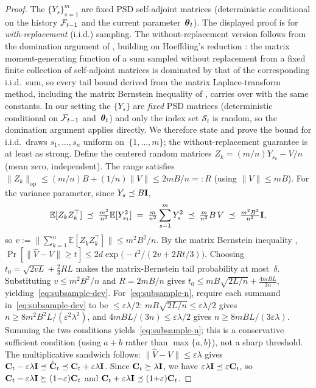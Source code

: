 \documentclass[twoside]{article}
\begin{document}
\begin{proof}
The $\{Y_s\}_{s=1}^m$ are fixed PSD self-adjoint matrices (deterministic
conditional on the history $\mathcal{F}_{t-1}$ and the current
parameter~$\boldsymbol{\theta}_t$).
The displayed proof is for \emph{with-replacement} (i.i.d.) sampling.
The without-replacement version follows from the domination argument of
\citet{gross2010note}, building on Hoeffding's reduction
\citep{hoeffding1963probability}: the matrix moment-generating function
of a sum sampled without replacement from a fixed finite collection of
self-adjoint matrices is dominated by that of the corresponding
i.i.d.\ sum, so every tail bound derived from the matrix
Laplace-transform method, including the matrix Bernstein inequality of
\citet[Thm.~6.1.1]{tropp2015introduction}, carries over with the same
constants.
In our setting the $\{Y_s\}$ are \emph{fixed} PSD matrices
(deterministic conditional on $\mathcal{F}_{t-1}$ and~$\boldsymbol{\theta}_t$) and only
the index set $\mathcal{S}_t$ is random, so the domination argument
applies directly.
We therefore state and prove the bound for i.i.d.\ draws
$s_1,\dots,s_n$ uniform on~$\{1,\dots,m\}$; the
without-replacement guarantee is at least as strong.
Define the centered random matrices
$Z_k = (m/n)Y_{s_k} - V/n$ (mean zero, independent).
The range satisfies
$\|Z_k\|_{\mathrm{op}} \le (m/n)B + (1/n)\|V\| \le 2mB/n =: R$
(using $\|V\|\le mB$).
For the variance parameter, since $Y_s\preceq B\mathbf{I}$,
\[
  \mathbb{E}[Z_k Z_k^\top]
  \;\preceq\; \tfrac{m^2}{n^2}\mathbb{E}[Y_{s_1}^2]
  \;=\; \tfrac{m}{n^2}\sum_{s=1}^m Y_s^2
  \;\preceq\; \tfrac{m}{n^2}B\,V
  \;\preceq\; \tfrac{m^2B^2}{n^2}\mathbf{I},
\]
so $v :=
\bigl\|\sum_{k=1}^n\mathbb{E}[Z_kZ_k^\top]\bigr\|\le m^2B^2/n$.
By the matrix Bernstein inequality
\citep[Thm.~6.1.1]{tropp2015introduction},
$\Pr[\|\hat V{-}V\| \ge t]
\le 2d\exp\!\bigl(-t^2/(2v + 2Rt/3)\bigr)$.
Choosing
$t_0=\sqrt{2vL}+\tfrac{2}{3}RL$
makes the matrix-Bernstein tail probability at most~$\delta$.  Substituting
$v\le m^2B^2/n$ and $R=2mB/n$ gives
$t_0\le mB\sqrt{2L/n}+\tfrac{4mBL}{3n}$,
yielding~\eqref{eq:subsample-dev}.
For~\eqref{eq:subsample-n}, require each summand
in~\eqref{eq:subsample-dev} to be $\le\varepsilon\lambda/2$:
$mB\sqrt{2L/n}\le\varepsilon\lambda/2$ gives
$n\ge 8m^2B^2L/(\varepsilon^2\lambda^2)$, and
$4mBL/(3n)\le\varepsilon\lambda/2$ gives
$n\ge 8mBL/(3\varepsilon\lambda)$.
Summing the two conditions
yields~\eqref{eq:subsample-n}; this is a conservative sufficient
condition (using $a+b$ rather than $\max\{a,b\}$), not a sharp threshold.
The multiplicative sandwich follows:
$\|\hat V{-}V\|\le\varepsilon\lambda$ gives
$\mathbf{C}_t - \varepsilon\lambda\mathbf{I} \preceq \hat{\mathbf{C}}_t \preceq
\mathbf{C}_t + \varepsilon\lambda\mathbf{I}$.
Since $\mathbf{C}_t\succeq\lambda\mathbf{I}$, we have
$\varepsilon\lambda\mathbf{I} \preceq \varepsilon\mathbf{C}_t$, so
$\mathbf{C}_t - \varepsilon\lambda\mathbf{I} \succeq (1{-}\varepsilon)\mathbf{C}_t$ and
$\mathbf{C}_t + \varepsilon\lambda\mathbf{I} \preceq (1{+}\varepsilon)\mathbf{C}_t$.
\end{proof}
\end{document}
